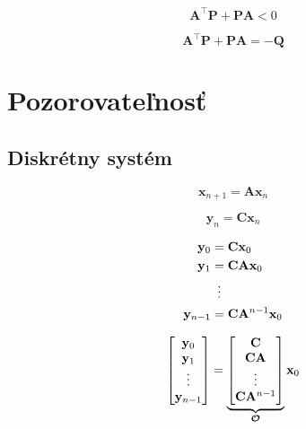 \documentclass[a4paper, 10pt, ]{article}
\begin{document}
\begin{equation}
    \bm{A}^\top \bm{P} + \bm{P} \bm{A} < 0
\end{equation}

\begin{equation}
    \bm{A}^\top \bm{P} + \bm{P} \bm{A} = -\bm{Q}
\end{equation}



\section{Pozorovateľnosť}


\subsection{Diskrétny systém}

\begin{equation}
    \label{Observability.Discrete.Equation:StateSpaceModel}
    \bm{x}_{n + 1} = \bm{A} \bm{x}_{n}
\end{equation}

\begin{equation}
    \bm{y}_n = \bm{C} \bm{x}_{n}
\end{equation}

\begin{subequations}
    \begin{align}
        \bm{y}_0       &= \bm{C} \bm{x}_{0}                \\
        \bm{y}_1       &= \bm{C} \bm{A} \bm{x}_{0}         \\
        &\vdotswithin{=}                                   \\
        \bm{y}_{n - 1} &= \bm{C} \bm{A}^{n - 1} \bm{x}_{0}
    \end{align}
\end{subequations}

\begin{equation}
    \begin{bmatrix}
        \mathbf{y}_0       \\
        \mathbf{y}_1       \\
        \vdots         \\
        \mathbf{y}_{n - 1} \\
    \end{bmatrix} = 
    \underbrace{
        \begin{bmatrix}
            \mathbf{C}                \\
            \mathbf{C} \mathbf{A}         \\
            \vdots                \\
            \mathbf{C} \mathbf{A}^{n - 1} \\
        \end{bmatrix}
    }_{\boldsymbol{\mathcal{O}}}
    \mathbf{x}_0
\end{equation}
\end{document}
